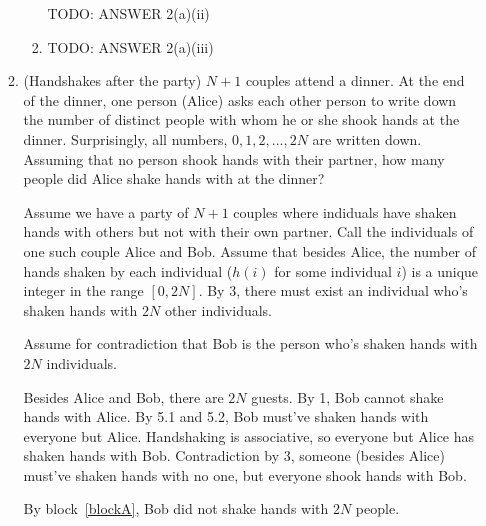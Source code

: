 \documentclass[11pt]{article}
\begin{document}
\begin{enumerate}
\begin{enumerate}
\begin{enumerate}
      TODO: ANSWER 2(a)(ii) 

    \item

      TODO: ANSWER 2(a)(iii)

    \end{enumerate}
    
  \item

          \begin{theorem}[Problem 7]
       (Handshakes after the party) $N + 1$ couples attend a dinner. At the end of the dinner, 
        one person (Alice) asks each other person to write down the number of distinct people 
        with whom he or she shook hands at the dinner. Surprisingly, all numbers, 
        $0, 1, 2, ..., 2N$ are written down. Assuming that no person shook hands with their 
        partner, how many people did Alice shake hands with at the dinner?
      \end{theorem}

      \begin{longFormProof}
       \step Assume we have a party of $N + 1$ couples where indiduals have shaken 
              hands with others but not with their own partner.
       \step Call the individuals of one such couple Alice and Bob.
       \step Assume that besides Alice, the number of hands shaken by each individual 
            ($h(i)$ for some individual $i$) is a unique integer in the range $[0,2N]$.
       \step By 3, there must exist an individual who's shaken hands with $2N$ other individuals.
       \begin{block}[blockA]
          {Assume for contradiction that Bob is the person who's shaken hands with $2N$ individuals.}

          \step Besides Alice and Bob, there are $2N$ guests.
          \step By 1, Bob cannot shake hands with Alice.
          \step By 5.1 and 5.2, Bob must've shaken hands with everyone but Alice.
          \step Handshaking is associative, so everyone but Alice has shaken hands with Bob.
          \step Contradiction by 3, someone (besides Alice) must've shaken hands with no one, but everyone shook hands with Bob.
       
       \end{block}

       \step By block~\ref{blockA}, Bob did not shake hands with $2N$ people.
       
       \smallskip
       \hrulefill
       \smallskip
       

\end{longFormProof}
\end{enumerate}
\end{enumerate}
\end{document}
